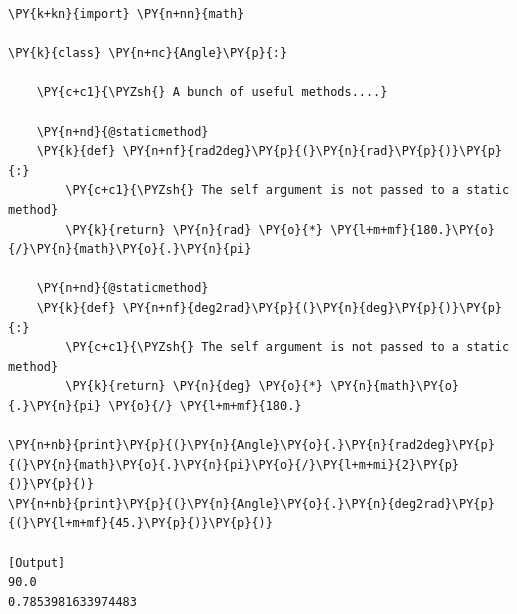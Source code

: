 \begin{Verbatim}[label=\makebox{\url{https://github.com/lucabaldini/cmepda/tree/master/slides/latex/snippets/staticmethod.py}},commandchars=\\\{\}]
\PY{k+kn}{import} \PY{n+nn}{math} 

\PY{k}{class} \PY{n+nc}{Angle}\PY{p}{:}
    
    \PY{c+c1}{\PYZsh{} A bunch of useful methods....}
    
    \PY{n+nd}{@staticmethod}
    \PY{k}{def} \PY{n+nf}{rad2deg}\PY{p}{(}\PY{n}{rad}\PY{p}{)}\PY{p}{:}
        \PY{c+c1}{\PYZsh{} The self argument is not passed to a static method}
        \PY{k}{return} \PY{n}{rad} \PY{o}{*} \PY{l+m+mf}{180.}\PY{o}{/}\PY{n}{math}\PY{o}{.}\PY{n}{pi}
    
    \PY{n+nd}{@staticmethod}
    \PY{k}{def} \PY{n+nf}{deg2rad}\PY{p}{(}\PY{n}{deg}\PY{p}{)}\PY{p}{:}
        \PY{c+c1}{\PYZsh{} The self argument is not passed to a static method}
        \PY{k}{return} \PY{n}{deg} \PY{o}{*} \PY{n}{math}\PY{o}{.}\PY{n}{pi} \PY{o}{/} \PY{l+m+mf}{180.}
        
\PY{n+nb}{print}\PY{p}{(}\PY{n}{Angle}\PY{o}{.}\PY{n}{rad2deg}\PY{p}{(}\PY{n}{math}\PY{o}{.}\PY{n}{pi}\PY{o}{/}\PY{l+m+mi}{2}\PY{p}{)}\PY{p}{)}
\PY{n+nb}{print}\PY{p}{(}\PY{n}{Angle}\PY{o}{.}\PY{n}{deg2rad}\PY{p}{(}\PY{l+m+mf}{45.}\PY{p}{)}\PY{p}{)}

[Output]
90.0
0.7853981633974483
\end{Verbatim}